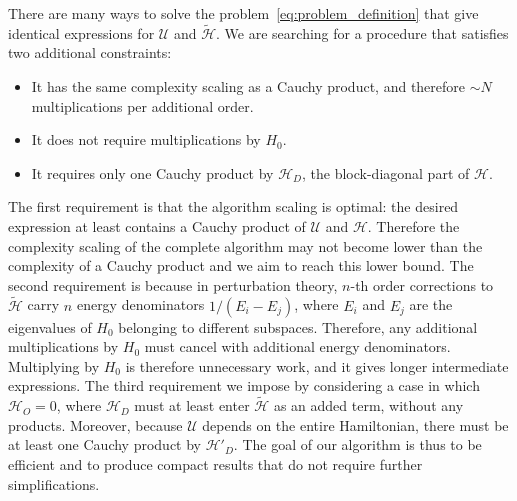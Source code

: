 There are many ways to solve the problem~\eqref{eq:problem_definition} that give identical expressions for $\mathcal{U}$ and $\tilde{\mathcal{H}}$.
We are searching for a procedure that satisfies two additional constraints:
%
\begin{itemize}
    \item It has the same complexity scaling as a Cauchy product, and therefore
    $\sim N$ multiplications per additional order.
    \item It does not require multiplications by $H_0$.
    \item It requires only one Cauchy product by $\mathcal{H}_D$, the block-diagonal
    part of $\mathcal{H}$.
\end{itemize}
%
The first requirement is that the algorithm scaling is optimal: the desired expression at least contains a Cauchy product of $\mathcal{U}$ and $\mathcal{H}$.
Therefore the complexity scaling of the complete algorithm may not become lower than the complexity of a Cauchy product and we aim to reach this lower bound.
The second requirement is because in perturbation theory, $n$-th order corrections to $\tilde{\mathcal{H}}$ carry $n$ energy denominators $1/(E_i - E_j)$, where $E_i$ and $E_j$ are the eigenvalues of $H_0$ belonging to different subspaces.
Therefore, any additional multiplications by $H_0$ must cancel with additional energy denominators.
Multiplying by $H_0$ is therefore unnecessary work, and it gives longer intermediate expressions.
The third requirement we impose by considering a case in which $\mathcal{H}_{O}=0$, where $\mathcal{H}_D$ must at least enter $\tilde{\mathcal{H}}$ as an added term, without any products.
Moreover, because $\mathcal{U}$ depends on the entire Hamiltonian, there must be at least one Cauchy product by $\mathcal{H}'_D$.
The goal of our algorithm is thus to be efficient and to produce compact results that do not require further simplifications.

